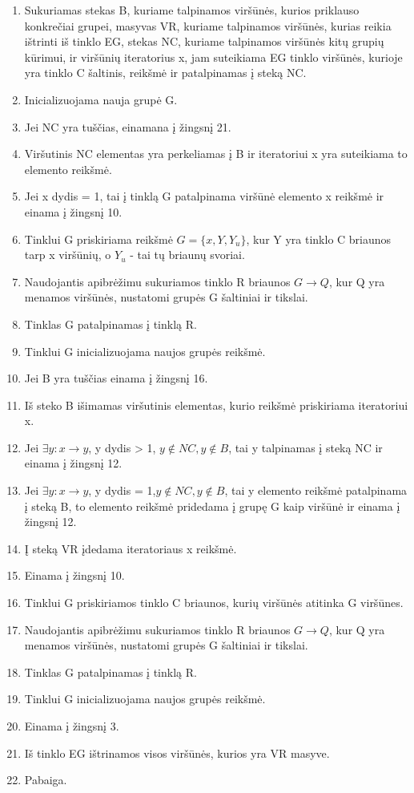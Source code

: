 \begin{enumerate}
	\item Sukuriamas stekas B, kuriame talpinamos viršūnės, kurios priklauso konkrečiai grupei, masyvas VR, kuriame talpinamos viršūnės, kurias reikia ištrinti iš tinklo EG, stekas NC, kuriame talpinamos viršūnės kitų grupių kūrimui, ir viršūnių iteratorius x, jam suteikiama EG tinklo viršūnės, kurioje yra tinklo C šaltinis, reikšmė ir patalpinamas į steką NC.
	\item Inicializuojama nauja grupė G.
	\item Jei NC yra tuščias, einamana į žingsnį 21.
	\item Viršutinis NC elementas yra perkeliamas į B ir iteratoriui x yra suteikiama to elemento reikšmė.
	\item Jei x dydis = 1, tai į tinklą G patalpinama viršūnė elemento x reikšmė ir einama į žingsnį 10.
	\item Tinklui G priskiriama reikšmė $G=\{x, Y, Y_u\}$, kur Y yra tinklo C briaunos tarp x viršūnių, o $Y_u$ - tai tų briaunų svoriai. 
	\item Naudojantis apibrėžimu sukuriamos tinklo R briaunos $G \rightarrow Q$, kur Q yra menamos viršūnės, nustatomi grupės G šaltiniai ir tikslai.
	\item Tinklas G patalpinamas į tinklą R.
	\item Tinklui G inicializuojama naujos grupės reikšmė.
	\item Jei B yra tuščias einama į žingsnį 16.
	\item Iš steko B išimamas viršutinis elementas, kurio reikšmė priskiriama iteratoriui x.
	\item Jei $\exists y : x \rightarrow y$, y dydis > 1, $y \notin NC, y \notin B$, tai y talpinamas į steką NC ir einama į žingsnį 12.
	\item Jei $\exists y : x \rightarrow y$, y dydis = 1,$y \notin NC, y \notin B$, tai y elemento reikšmė patalpinama į steką B, to elemento reikšmė pridedama į grupę G kaip viršūnė ir einama į žingsnį 12.
	\item Į steką VR įdedama iteratoriaus x reikšmė.
	\item Einama į žingsnį 10.
	\item Tinklui G priskiriamos tinklo C briaunos, kurių viršūnės atitinka G viršūnes. 
	\item Naudojantis apibrėžimu sukuriamos tinklo R briaunos $G \rightarrow Q$, kur Q yra menamos viršūnės, nustatomi grupės G šaltiniai ir tikslai.
	\item Tinklas G patalpinamas į tinklą R.
	\item Tinklui G inicializuojama naujos grupės reikšmė.
	\item  Einama į žingsnį 3.
	\item  Iš tinklo EG ištrinamos visos viršūnės, kurios yra VR masyve.
	\item  Pabaiga.
\end{enumerate}

